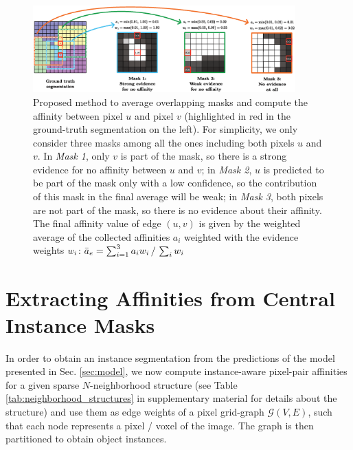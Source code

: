\begin{figure}[t]
\centering
        \includegraphics[width=0.9\textwidth]{./figs/mask_average_new.eps} %
        \caption{Proposed method to average overlapping masks and compute the affinity between pixel $u$ and pixel $v$ (highlighted in red in the ground-truth segmentation on the left). For simplicity, we only consider three masks among all the ones including both pixels $u$ and $v$. 
        In \emph{Mask 1}, only $v$ is part of the mask, so there is a strong evidence for no affinity between $u$ and $v$; in \emph{Mask 2},  $u$ is predicted to be part of the mask only with a low confidence, so the contribution of this mask in the final average will be weak; in \emph{Mask 3}, both pixels are not part of the \maskname mask, so there is no evidence about their affinity. 
        The final affinity value of edge $(u,v)$ is given by the weighted average of the collected affinities $a_i$ weighted with the evidence weights $w_i$: $\bar{a}_e= \sum_{i=1}^3 a_i w_i\,/\,\sum_{i}w_i$}
    \label{fig:alg_explained}
\end{figure}


\section{Extracting Affinities from Central Instance Masks}
In order to obtain an instance segmentation from the predictions of the model presented in Sec. \ref{sec:model}, we now compute instance-aware pixel-pair affinities for a given sparse $N$-neighborhood structure (see Table \ref{tab:neighborhood_structures} in supplementary material for details about the structure) and use them as edge weights of a pixel grid-graph $\mathcal{G}(V,E)$, such that each node represents a pixel / voxel of the image. The graph is then partitioned to obtain object instances.



